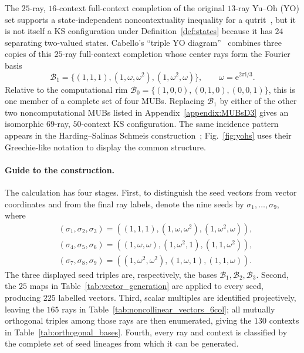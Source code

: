 \documentclass[%
  reprint,
  superscriptaddress,
  showpacs,
  showkeys,
  amsmath,amssymb,
  pra,
  longbibliography,
  floatfix,
  x11names
]{revtex4-2}
\newcommand{\ii}{\mathrm{i}}
\newenvironment{revision}{\begingroup}{\endgroup}
\begin{document}
\begin{revision}
The $25$-ray, $16$-context full-context completion of the original $13$-ray Yu--Oh (YO) set supports a state-independent noncontextuality inequality for a qutrit~\cite{PhysRevLett.103.050401,Yu-2012,Yu2015}, but it is not itself a KS configuration under Definition~\ref{def:states} because it has $24$ separating two-valued states.  Cabello's ``triple YO diagram''~\cite{Cabello2025} combines three copies of this $25$-ray full-context completion whose center rays form the Fourier basis
\[
\mathcal{B}_1=\{(1,1,1),(1,\omega,\omega^2),(1,\omega^2,\omega)\},
\qquad \omega=\mathrm{e}^{2\pi\ii{}/3}.
\]
Relative to the computational rim $\mathcal{B}_0=\{(1,0,0),(0,1,0),(0,0,1)\}$, this is one member of a complete set of four MUBs.  Replacing $\mathcal{B}_1$ by either of the other two noncomputational MUBs listed in Appendix~\ref{appendix:MUBsD3} gives an isomorphic $69$-ray, $50$-context KS configuration.  The same incidence pattern appears in the Harding--Salinas Schmeis construction~\cite[Fig.~2 and Theorem~2.6]{harding2025remarksIJTP}; Fig.~\ref{fig:yohs} uses their Greechie-like notation to display the common structure.

\paragraph*{Guide to the construction.}
The calculation has four stages.  First, to distinguish the seed vectors from
vector coordinates and from the final ray labels, denote the nine seeds by
\ensuremath{\sigma_1,\ldots,\sigma_9}, where
\[
\begin{aligned}
&\ensuremath{(\sigma_1,\sigma_2,\sigma_3)=((1,1,1),(1,\omega,\omega^2),(1,\omega^2,\omega))},\\
&\ensuremath{(\sigma_4,\sigma_5,\sigma_6)=((1,\omega,\omega),(1,\omega^2,1),(1,1,\omega^2))},\\
&\ensuremath{(\sigma_7,\sigma_8,\sigma_9)=((1,\omega^2,\omega^2),(1,\omega,1),(1,1,\omega))}.
\end{aligned}
\]
The three displayed seed triples are, respectively, the bases
\ensuremath{\mathcal{B}_1,\mathcal{B}_2,\mathcal{B}_3}.
Second, the $25$ maps in Table~\ref{tab:vector_generation} are applied to every seed, producing $225$ labelled vectors.  Third, scalar multiples are identified projectively, leaving the $165$ rays in Table~\ref{tab:noncollinear_vectors_6col}; all mutually orthogonal triples among those rays are then enumerated, giving the $130$ contexts in Table~\ref{tab:orthogonal_bases}.  Fourth, every ray and context is classified by the complete set of seed lineages from which it can be generated.


\end{revision}
\end{document}
